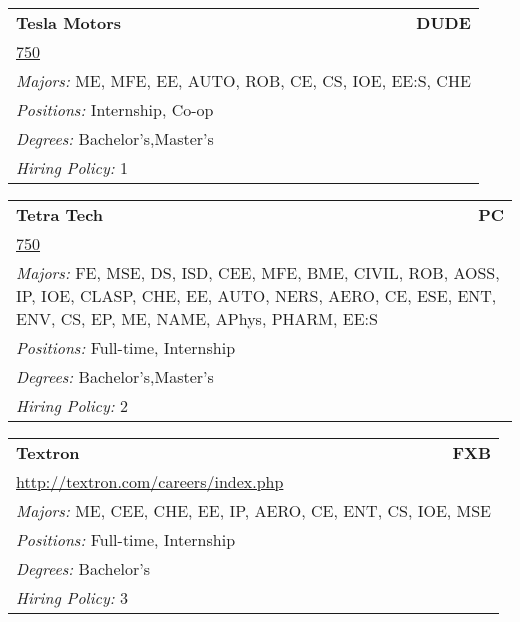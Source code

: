 \documentclass[twoside]{article}
\begin{document}
\begin{center}
\begin{multicols}{3}
\begin{FlushLeft}
\begin{minipage}{.9\columnwidth}\begin{tabularx}{.95\columnwidth}{Xr}
                 {\Large\bf Tesla Motors} & {\Large\bf DUDE}\\
    \multicolumn{2}{p{.95\columnwidth}}{\url{750}}\\
    \multicolumn{2}{p{.95\columnwidth}}{\emph{Majors:} ME, MFE, EE, AUTO, ROB, CE, CS, IOE, EE:S, CHE}\\
    \multicolumn{2}{p{.95\columnwidth}}{\emph{Positions:} Internship, Co-op}\\
    \multicolumn{2}{p{.95\columnwidth}}{\emph{Degrees:} Bachelor's,Master's}\\
    \multicolumn{2}{p{.95\columnwidth}}{\emph{Hiring Policy:} 1}\\
    \end{tabularx}
    
\end{minipage}
 
\begin{minipage}{.9\columnwidth}\begin{tabularx}{.95\columnwidth}{Xr}
                 {\Large\bf Tetra Tech} & {\Large\bf PC}\\
    \multicolumn{2}{p{.95\columnwidth}}{\url{750}}\\
    \multicolumn{2}{p{.95\columnwidth}}{\emph{Majors:} FE, MSE, DS, ISD, CEE, MFE, BME, CIVIL, ROB, AOSS, IP, IOE, CLASP, CHE, EE, AUTO, NERS, AERO, CE, ESE, ENT, ENV, CS, EP, ME, NAME, APhys, PHARM, EE:S}\\
    \multicolumn{2}{p{.95\columnwidth}}{\emph{Positions:} Full-time, Internship}\\
    \multicolumn{2}{p{.95\columnwidth}}{\emph{Degrees:} Bachelor's,Master's}\\
    \multicolumn{2}{p{.95\columnwidth}}{\emph{Hiring Policy:} 2}\\
    \end{tabularx}
    
\end{minipage}
 
\begin{minipage}{.9\columnwidth}\begin{tabularx}{.95\columnwidth}{Xr}
                 {\Large\bf Textron} & {\Large\bf FXB}\\
    \multicolumn{2}{p{.95\columnwidth}}{\url{http://textron.com/careers/index.php}}\\
    \multicolumn{2}{p{.95\columnwidth}}{\emph{Majors:} ME, CEE, CHE, EE, IP, AERO, CE, ENT, CS, IOE, MSE}\\
    \multicolumn{2}{p{.95\columnwidth}}{\emph{Positions:} Full-time, Internship}\\
    \multicolumn{2}{p{.95\columnwidth}}{\emph{Degrees:} Bachelor's}\\
    \multicolumn{2}{p{.95\columnwidth}}{\emph{Hiring Policy:} 3}\\
    \end{tabularx}
    

\end{minipage}
\end{FlushLeft}
\end{multicols}
\end{center}
\end{document}
